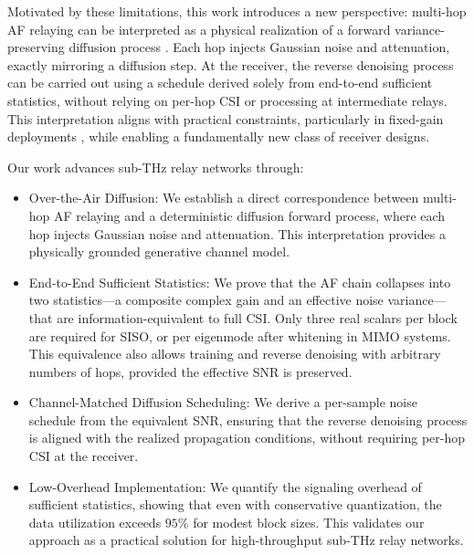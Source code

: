 \documentclass[journal]{IEEEtran}
\begin{document}
Motivated by these limitations, this work introduces a new perspective: multi-hop AF relaying can be interpreted as a physical realization of a forward variance-preserving diffusion process \cite{ho2020denoising,sohl2015deep}. Each hop injects Gaussian noise and attenuation, exactly mirroring a diffusion step. At the receiver, the reverse denoising process can be carried out using a schedule derived solely from end-to-end sufficient statistics, without relying on per-hop CSI or processing at intermediate relays. This interpretation aligns with practical constraints, particularly in fixed-gain deployments \cite{bhardwaj2022fixed}, while enabling a fundamentally new class of receiver designs.

Our work advances sub-THz relay networks through:
\begin{itemize}
    \item {Over-the-Air Diffusion:} We establish a direct correspondence between multi-hop AF relaying and a deterministic diffusion forward process, where each hop injects Gaussian noise and attenuation. This interpretation provides a physically grounded generative channel model.

    \item {End-to-End Sufficient Statistics:} We prove that the AF chain collapses into two statistics—a composite complex gain and an effective noise variance—that are information-equivalent to full CSI. Only three real scalars per block are required for SISO, or per eigenmode after whitening in MIMO systems. This equivalence also allows training and reverse denoising with arbitrary numbers of hops, provided the effective SNR is preserved. 

    \item {Channel-Matched Diffusion Scheduling:} We derive a per-sample noise schedule from the equivalent SNR, ensuring that the reverse denoising process is aligned with the realized propagation conditions, without requiring per-hop CSI at the receiver.

    \item {Low-Overhead Implementation:} We quantify the signaling overhead of sufficient statistics, showing that even with conservative quantization, the data utilization exceeds $95\%$ for modest block sizes. This validates our approach as a practical solution for high-throughput sub-THz relay networks.
\end{itemize}



\end{document}
